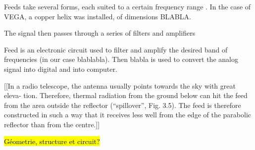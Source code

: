 Feeds take several forms, each suited to a certain frequency range \cite{lauterbach_radio_2022}. In the case of VEGA, a copper helix was installed, of dimensions BLABLA.

The signal then passes through a series of filters and amplifiers

Feed is an electronic circuit used to filter and amplify the desired band of frequencies (in our case blablabla).
Then blabla is used to convert the analog signal into digital and into computer.

[[In a radio telescope, the antenna usually points towards the sky with great eleva-
tion. Therefore, thermal radiation from the ground below can hit the feed from the
area outside the reflector (“spillover”, Fig. 3.5). The feed is therefore constructed
in such a way that it receives less well from the edge of the parabolic reflector than
from the centre.]]


\hl{Géometrie, structure et circuit?}
\cite{installation_manual_2022}
\cite{interdisciplinary_project_2022}

